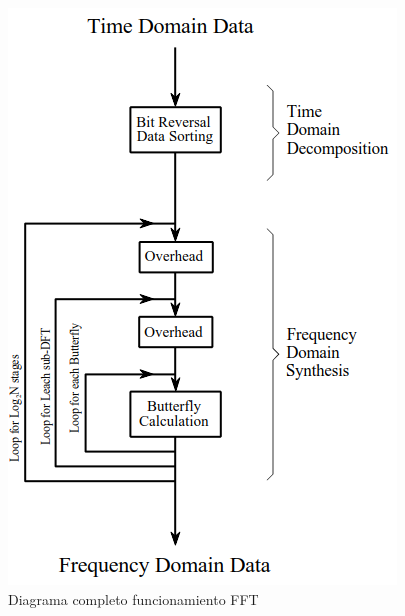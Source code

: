 \begin{figure}[H]
	\centering
	\includegraphics[scale=.7]{img/fft.png}
	\caption{Diagrama completo funcionamiento FFT}
	\label{fig:prebssDa}		
\end{figure}